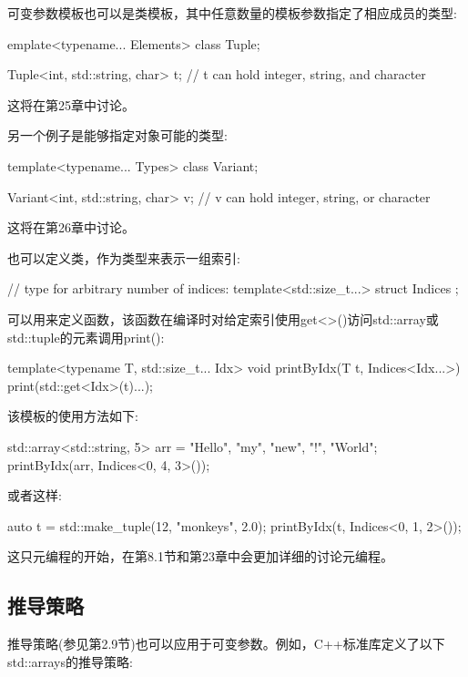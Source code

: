 可变参数模板也可以是类模板，其中任意数量的模板参数指定了相应成员的类型:

\begin{cpp}
emplate<typename... Elements>
class Tuple;

Tuple<int, std::string, char> t; // t can hold integer, string, and character
\end{cpp}

这将在第25章中讨论。

另一个例子是能够指定对象可能的类型:

\begin{cpp}
template<typename... Types>
class Variant;

Variant<int, std::string, char> v; // v can hold integer, string, or character
\end{cpp}

这将在第26章中讨论。

也可以定义类，作为类型来表示一组索引:

\begin{cpp}
// type for arbitrary number of indices:
template<std::size_t...>
struct Indices {
};
\end{cpp}

可以用来定义函数，该函数在编译时对给定索引使用get<>()访问std::array或std::tuple的元素调用print():

\begin{cpp}
template<typename T, std::size_t... Idx>
void printByIdx(T t, Indices<Idx...>)
{
	print(std::get<Idx>(t)...);
}
\end{cpp}

该模板的使用方法如下:

\begin{cpp}
std::array<std::string, 5> arr = {"Hello", "my", "new", "!", "World"};
printByIdx(arr, Indices<0, 4, 3>());
\end{cpp}

或者这样:

\begin{cpp}
auto t = std::make_tuple(12, "monkeys", 2.0);
printByIdx(t, Indices<0, 1, 2>());
\end{cpp}

这只元编程的开始，在第8.1节和第23章中会更加详细的讨论元编程。

\subsection{推导策略}

推导策略(参见第2.9节)也可以应用于可变参数。例如，C++标准库定义了以下std::arrays的推导策略:

